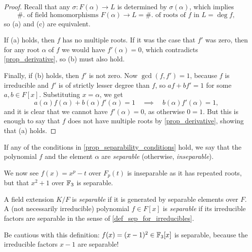 \begin{proof}
    Recall that any $\sigma: F(\alpha) \to L$ is determined by $\sigma(\alpha)$, which implies
    \[
        \#. \text{ of field homomorphisms } F(\alpha) \to L
        = \#. \text{ of roots of } f \text{ in } L
        = \deg{f},
    \]
    so (a) and (c) are equivalent.
    
    If (a) holds, then $f$ has no multiple roots. If it was the case that $f'$ was zero, then for any root $\alpha$ of $f$ we would have $f'(\alpha) = 0$, which contradicts \cref{prop_derivative}, so (b) must also hold.
    
    Finally, if (b) holds, then $f'$ is not zero. Now $\gcd(f, f') = 1$, because $f$ is irreducible and $f'$ is of strictly lesser degree than $f$, so $af + bf' = 1$ for some $a, b \in F[x]$. Substituting $x = \alpha$, we get
    \[
        a(\alpha)f(\alpha) + b(\alpha)f'(\alpha) = 1
        \quad \implies \quad
        b(\alpha)f'(\alpha) = 1,
    \]
    and it is clear that we cannot have $f'(\alpha) = 0$, as otherwise $0 = 1$. But this is enough to say that $f$ does not have multiple roots by \cref{prop_derivative}, showing that (a) holds.
\end{proof}

\begin{definition}
\label{def_sep_for_irreducibles}
    If any of the conditions in \cref{prop_separability_conditions} hold, we say that the polynomial $f$ and the element $\alpha$ are \emph{separable} (otherwise, \emph{inseparable}).
\end{definition}

\begin{example}
    We now see $f(x) = x^p - t$ over $F_p(t)$ is inseparable as it has repeated roots, but that $x^2 + 1$ over $\mathbb{{F}}_3$ is separable.
\end{example}

\begin{definition}
    A field extension $K/F$ is \emph{separable} if it is generated by separable elements over $F$. A (not necessarily irreducible) polynomial $f \in F[x]$ is \emph{separable} if its irreducible factors are separable in the sense of \cref{def_sep_for_irreducibles}.
\end{definition}

\begin{example}
    Be cautious with this definition: $f(x) = (x - 1)^2 \in \mathbb{{F}}_3[x]$ is separable, because the irreducible factors $x - 1$ are separable!
\end{example}

